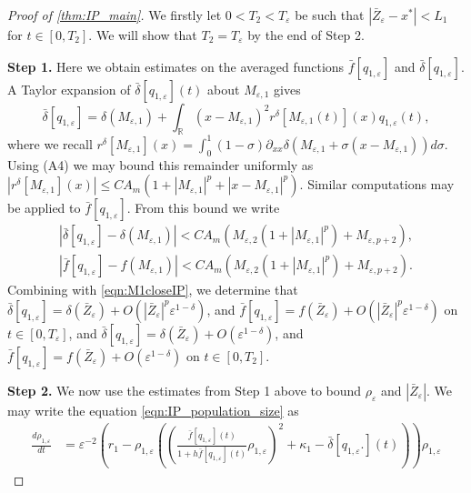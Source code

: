 \documentclass[]{article}
\theoremstyle{remark}
\begin{document}
\begin{proof}[{Proof of \cref{thm:IP_main}}]
 We firstly let $0<T_2<T_\varepsilon$ be such that $|\bar{Z}_\varepsilon-x^{*}|<L_1$ for $t\in[0,T_2]$. We will show that $T_2=T_\varepsilon$ by the end of Step 2. 
 
\textbf{Step 1.} Here we obtain estimates on the averaged functions $\bar{f}[q_{1,\varepsilon}]$ and $\bar{\delta}[q_{1,\varepsilon}]$. 
A Taylor expansion of $\bar{\delta}[q_{1,\varepsilon}](t)$ about $M_{\varepsilon,1}$ gives
\[\bar{\delta}[q_{1,\varepsilon}]=\delta(M_{\varepsilon,1})+\int_{\mathbb{R}}(x-M_{\varepsilon,1})^2r^\delta[M_{\varepsilon,1}(t)](x)q_{1,\varepsilon}(t),\]
where we recall $r^\delta[M_{\varepsilon,1}](x)=\int_{0}^{1}(1-\sigma)\partial_{xx}\delta(M_{\varepsilon,1}+\sigma(x-M_{\varepsilon,1}))d\sigma$. Using (A4) we may bound this remainder uniformly as
$|r^\delta[M_{\varepsilon,1}](x)|\leq{}CA_m(1+|M_{\varepsilon,1}|^p+|x-M_{\varepsilon,1}|^p).$
Similar computations  may be applied to $\bar{f}[q_{1,\varepsilon}]$.
From this bound we write
\begin{align*}
    |\bar{\delta}[q_{1,\varepsilon}]-\delta(M_{\varepsilon,1})|<CA_m(M_{\varepsilon,2}(1+|M_{\varepsilon,1}|^p)+M_{\varepsilon,p+2}),\\
      |\bar{f}[q_{1,\varepsilon}]-f(M_{\varepsilon,1})|<CA_m(M_{\varepsilon,2}(1+|M_{\varepsilon,1}|^p)+M_{\varepsilon,p+2}). 
\end{align*}
Combining with \eqref{eqn:M1closeIP}, we determine that $\bar{\delta}[q_{1,\varepsilon}]=\delta(\bar{Z}_{\varepsilon})+O(|\bar{Z}_\varepsilon|^p\varepsilon^{1-\delta})$, and $\bar{f}[q_{1,\varepsilon}]=f(\bar{Z}_\varepsilon)+O(|\bar{Z}_\varepsilon|^p\varepsilon^{1-\delta})$ on $t\in[0,T_\varepsilon]$, and  $\bar{\delta}[q_{1,\varepsilon}]=\delta(\bar{Z}_{\varepsilon})+O(\varepsilon^{1-\delta})$, and $\bar{f}[q_{1,\varepsilon}]=f(\bar{Z}_\varepsilon)+O(\varepsilon^{1-\delta})$ on $t\in[0,T_2]$. 




\textbf{Step 2.} We now use the estimates from Step 1 above to  bound $\rho_\varepsilon$ and $|\bar{Z}_\varepsilon|$. We may write the equation \eqref{eqn:IP_population_size} as
\begin{align*}
\frac{d\rho_{1,\varepsilon}}{dt}&=\varepsilon^{-2}\left(r_1-\rho_{1,\varepsilon}\left(\left(\frac{\bar{f}[q_{1,\varepsilon}](t)}{1+h\bar{f}[q_{1,\varepsilon}](t)}\rho_{1,\varepsilon}\right)^2+\kappa_1-\bar{\delta}[q_{1,\varepsilon}.](t)\right)\right)\rho_{1,\varepsilon}
\end{align*}


\end{proof}
\end{document}
